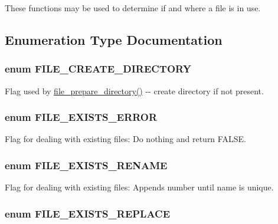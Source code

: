 These functions may be used to determine if and where a file is in use. 

\subsection{Enumeration Type Documentation}
\hypertarget{group__file_ga851cbf30c0a6d31a1733590cf80c39e5}{
\subsubsection[{FILE\_\-CREATE\_\-DIRECTORY}]{\setlength{\rightskip}{0pt plus 5cm}enum {\bf FILE\_\-CREATE\_\-DIRECTORY}}}
\label{group__file_ga851cbf30c0a6d31a1733590cf80c39e5}
Flag used by \hyperlink{group__file_ga738f89421a4f4c228676de817e5e485c}{file\_\-prepare\_\-directory()} -\/-\/ create directory if not present. \hypertarget{group__file_ga99e741faa66e03cdb8738b717be227fd}{
\subsubsection[{FILE\_\-EXISTS\_\-ERROR}]{\setlength{\rightskip}{0pt plus 5cm}enum {\bf FILE\_\-EXISTS\_\-ERROR}}}
\label{group__file_ga99e741faa66e03cdb8738b717be227fd}
Flag for dealing with existing files: Do nothing and return FALSE. \hypertarget{group__file_ga5d6636d4ccd022885823b91f17a0f464}{
\subsubsection[{FILE\_\-EXISTS\_\-RENAME}]{\setlength{\rightskip}{0pt plus 5cm}enum {\bf FILE\_\-EXISTS\_\-RENAME}}}
\label{group__file_ga5d6636d4ccd022885823b91f17a0f464}
Flag for dealing with existing files: Appends number until name is unique. \hypertarget{group__file_ga54c3c90d9cb7857114326cb5114e7159}{
\subsubsection[{FILE\_\-EXISTS\_\-REPLACE}]{\setlength{\rightskip}{0pt plus 5cm}enum {\bf FILE\_\-EXISTS\_\-REPLACE}}}
